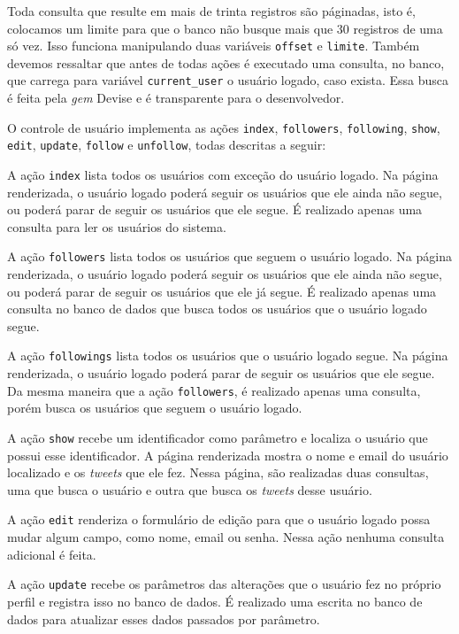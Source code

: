 Toda consulta que resulte em mais de trinta registros são páginadas, isto é, colocamos um limite para que o banco não busque mais que 30 registros de uma só vez. Isso funciona manipulando duas variáveis \verb|offset| e \verb|limite|. Também devemos ressaltar que
antes de todas ações é executado uma consulta, no banco, que carrega para variável \verb|current_user| o usuário logado, caso exista. Essa busca é feita pela \textit{gem} Devise e é transparente para o desenvolvedor.

O controle de usuário implementa as ações \verb|index|, \verb|followers|, \verb|following|, \verb|show|, \verb|edit|, \verb|update|, \verb|follow| e \verb|unfollow|, todas descritas a seguir:

A ação \verb|index| lista todos os usuários com exceção do usuário logado. Na página renderizada, o usuário logado poderá seguir os usuários que ele ainda não segue, ou poderá parar de seguir os usuários que ele segue. É realizado apenas uma consulta para ler os usuários do sistema.

A ação \verb|followers| lista todos os usuários que seguem o usuário logado. Na página renderizada, o usuário logado poderá seguir os usuários que ele ainda não segue, ou poderá parar de seguir os usuários que ele já segue. É realizado apenas uma consulta no banco de dados que busca todos os usuários que o usuário logado segue.

A ação \verb|followings| lista todos os usuários que o usuário logado segue. Na página renderizada, o usuário logado poderá parar de seguir os usuários que ele segue. Da mesma maneira que a ação \verb|followers|, é realizado apenas uma consulta, porém busca os usuários que seguem o usuário logado.

A ação \verb|show| recebe um identificador como parâmetro e localiza o usuário que possui esse identificador. A página renderizada mostra o nome e email do usuário localizado e os \textit{tweets} que ele fez. Nessa página, são realizadas duas consultas, uma que busca o usuário e outra que busca os \textit{tweets} desse usuário.

A ação \verb|edit| renderiza o formulário de edição para que o usuário logado possa mudar algum campo, como nome, email ou senha. Nessa ação nenhuma consulta adicional é feita.

A ação \verb|update| recebe os parâmetros das alterações que o usuário fez no próprio perfil e registra isso no banco de dados. É realizado uma escrita no banco de dados para atualizar esses dados passados por parâmetro.

